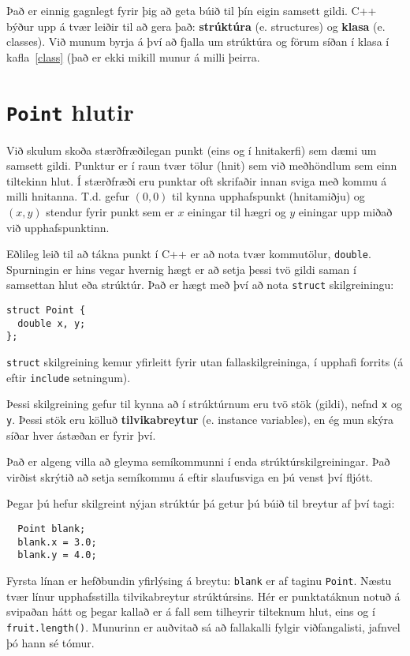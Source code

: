 Það er einnig gagnlegt fyrir þig að geta búið til þín eigin samsett gildi.
C++ býður upp á tvær leiðir til að gera það: {\bf strúktúra} (e. structures) og {\bf klasa} (e. classes).
Við munum byrja á því að fjalla um strúktúra og förum síðan í klasa í kafla~\ref{class} (það er ekki mikill munur á milli þeirra.

\section{{\tt Point} hlutir}

Við skulum skoða stærðfræðilegan punkt (eins og í hnitakerfi) sem dæmi um samsett gildi.
Punktur er í raun tvær tölur (hnit) sem við meðhöndlum sem einn tiltekinn hlut.
Í stærðfræði eru punktar oft skrifaðir innan sviga með kommu á milli hnitanna.
T.d. gefur $(0, 0)$ til kynna upphafspunkt (hnitamiðju) og $(x, y)$ stendur fyrir punkt sem er $x$ einingar til hægri og $y$ einingar upp miðað við upphafspunktinn.

Eðlileg leið til að tákna punkt í C++ er að nota tvær kommutölur, {\tt double}.
Spurningin er hins vegar hvernig hægt er að setja þessi tvö gildi saman í samsettan hlut eða strúktúr.
Það er hægt með því að nota {\tt struct} skilgreiningu:

\begin{verbatim}
struct Point {
  double x, y;
};  
\end{verbatim}
%
{\tt struct} skilgreining kemur yfirleitt fyrir utan fallaskilgreininga, í upphafi forrits (á eftir {\tt include} setningum).

Þessi skilgreining gefur til kynna að í strúktúrnum eru tvö stök (gildi), nefnd {\tt x} og {\tt y}.
Þessi stök eru kölluð {\bf tilvikabreytur} (e. instance variables), en ég mun skýra síðar hver ástæðan er fyrir því.

Það er algeng villa að gleyma semíkommunni í enda strúktúrskilgreiningar.
Það virðist skrýtið að setja semíkommu á eftir slaufusviga en þú venst því fljótt.

Þegar þú hefur skilgreint nýjan strúktúr þá getur þú búið til breytur af því tagi:

\begin{verbatim}
  Point blank;
  blank.x = 3.0;
  blank.y = 4.0;   
\end{verbatim}
%
Fyrsta línan er hefðbundin yfirlýsing á breytu: {\tt blank} er af taginu {\tt Point}.
Næstu tvær línur upphafsstilla tilvikabreytur strúktúrsins.
Hér er punktatáknun notuð á svipaðan hátt og þegar kallað er á fall sem tilheyrir tilteknum hlut, eins og í {\tt fruit.length()}.
Munurinn er auðvitað sá að fallakalli fylgir viðfangalisti, jafnvel þó hann sé tómur.

